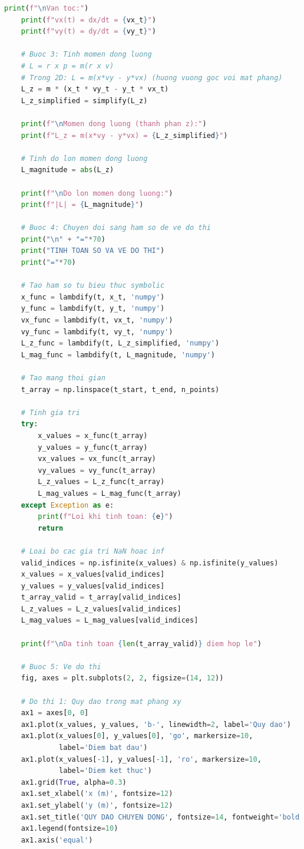 \documentclass{report}
\newcounter{line}
\begin{document}
\begin{lstlisting}[language=Python, caption={Chương trình tính toán mômen động lượng}, label={code:main}]
    print(f"\nVan toc:")
    print(f"vx(t) = dx/dt = {vx_t}")
    print(f"vy(t) = dy/dt = {vy_t}")
    
    # Buoc 3: Tinh momen dong luong
    # L = r x p = m(r x v)
    # Trong 2D: L = m(x*vy - y*vx) (huong vuong goc voi mat phang)
    L_z = m * (x_t * vy_t - y_t * vx_t)
    L_z_simplified = simplify(L_z)
    
    print(f"\nMomen dong luong (thanh phan z):")
    print(f"L_z = m(x*vy - y*vx) = {L_z_simplified}")
    
    # Tinh do lon momen dong luong
    L_magnitude = abs(L_z)
    
    print(f"\nDo lon momen dong luong:")
    print(f"|L| = {L_magnitude}")
    
    # Buoc 4: Chuyen doi sang ham so de ve do thi
    print("\n" + "="*70)
    print("TINH TOAN SO VA VE DO THI")
    print("="*70)
    
    # Tao ham so tu bieu thuc symbolic
    x_func = lambdify(t, x_t, 'numpy')
    y_func = lambdify(t, y_t, 'numpy')
    vx_func = lambdify(t, vx_t, 'numpy')
    vy_func = lambdify(t, vy_t, 'numpy')
    L_z_func = lambdify(t, L_z_simplified, 'numpy')
    L_mag_func = lambdify(t, L_magnitude, 'numpy')
    
    # Tao mang thoi gian
    t_array = np.linspace(t_start, t_end, n_points)
    
    # Tinh gia tri
    try:
        x_values = x_func(t_array)
        y_values = y_func(t_array)
        vx_values = vx_func(t_array)
        vy_values = vy_func(t_array)
        L_z_values = L_z_func(t_array)
        L_mag_values = L_mag_func(t_array)
    except Exception as e:
        print(f"Loi khi tinh toan: {e}")
        return
    
    # Loai bo cac gia tri NaN hoac inf
    valid_indices = np.isfinite(x_values) & np.isfinite(y_values)
    x_values = x_values[valid_indices]
    y_values = y_values[valid_indices]
    t_array_valid = t_array[valid_indices]
    L_z_values = L_z_values[valid_indices]
    L_mag_values = L_mag_values[valid_indices]
    
    print(f"\nDa tinh toan {len(t_array_valid)} diem hop le")
    
    # Buoc 5: Ve do thi
    fig, axes = plt.subplots(2, 2, figsize=(14, 12))
    
    # Do thi 1: Quy dao trong mat phang xy
    ax1 = axes[0, 0]
    ax1.plot(x_values, y_values, 'b-', linewidth=2, label='Quy dao')
    ax1.plot(x_values[0], y_values[0], 'go', markersize=10, 
             label='Diem bat dau')
    ax1.plot(x_values[-1], y_values[-1], 'ro', markersize=10, 
             label='Diem ket thuc')
    ax1.grid(True, alpha=0.3)
    ax1.set_xlabel('x (m)', fontsize=12)
    ax1.set_ylabel('y (m)', fontsize=12)
    ax1.set_title('QUY DAO CHUYEN DONG', fontsize=14, fontweight='bold')
    ax1.legend(fontsize=10)
    ax1.axis('equal')
    

\end{lstlisting}
\end{document}

